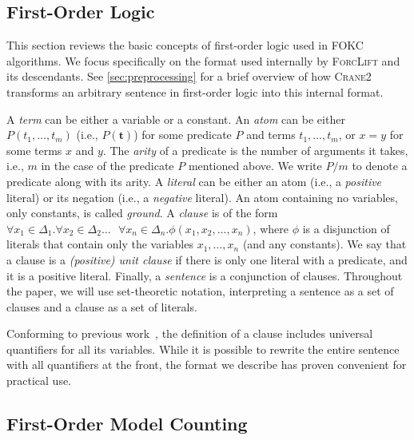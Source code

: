 \documentclass[a4paper,UKenglish,cleveref,autoref]{lipics-v2021}
\newcommand{\Cranetwo}{\textsc{Crane2}}
\begin{document}
\subsection{First-Order Logic}\label{sec:logic}

This section reviews the basic concepts of first-order logic used in FOKC
algorithms. We focus specifically on the format used internally by
\textsc{ForcLift} and its descendants. See \cref{sec:preprocessing} for a brief
overview of how \Cranetwo{} transforms an arbitrary sentence in first-order
logic into this internal format.

A \emph{term} can be either a variable or a constant. An \emph{atom} can be
either $P(t_{1}, \dots, t_{m})$ (i.e., $P(\mathbf{t})$) for some predicate $P$
and terms $t_{1}, \dots, t_{m}$, or $x=y$ for some terms $x$ and $y$. The
\emph{arity} of a predicate is the number of arguments it takes, i.e., $m$ in
the case of the predicate $P$ mentioned above. We write $P/m$ to denote a
predicate along with its arity. A \emph{literal} can be either an atom (i.e., a
\emph{positive} literal) or its negation (i.e., a \emph{negative} literal). An
atom containing no variables, only constants, is called \emph{ground}. A
\emph{clause} is of the form $\forall x_{1} \in \Delta_{1}\text{.
}\forall x_{2} \in \Delta_{2}\dots\text{ }\forall x_{n} \in \Delta_{n}\text{.
}\phi(x_{1}, x_{2}, \dots, x_{n})$, where $\phi$ is a disjunction of literals
that contain only the variables $x_{1}, \dots, x_{n}$ (and any constants). We
say that a clause is a \emph{(positive) unit clause} if there is only one
literal with a predicate, and it is a positive literal. Finally, a
\emph{sentence} is a conjunction of clauses. Throughout the paper, we will use
set-theoretic notation, interpreting a sentence as a set of clauses and a clause
as a set of literals.

\begin{remark*}
  Conforming to previous work~\cite{DBLP:conf/ijcai/BroeckTMDR11}, the
  definition of a clause includes universal quantifiers for all its variables.
  While it is possible to rewrite the entire sentence with all quantifiers at
  the front, the format we describe has proven convenient for practical use.
\end{remark*}

\subsection{First-Order Model Counting}\label{sec:fomc}
\end{document}
